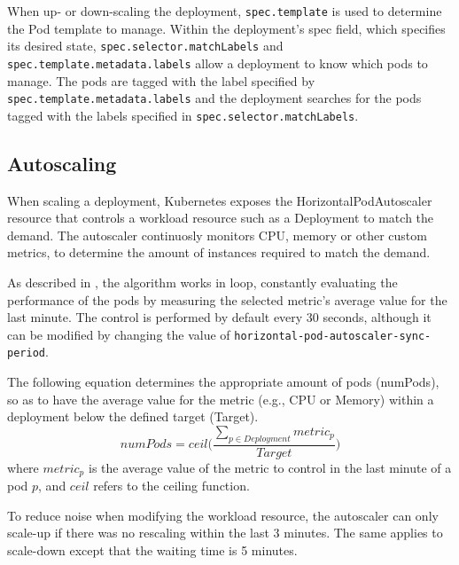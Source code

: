 \begin{sloppypar}
When up- or down-scaling the deployment, \lstinline{spec.template} is used to
determine the Pod template to manage. Within the deployment's spec field, which
specifies its desired state, \lstinline{spec.selector.matchLabels} and
\lstinline{spec.template.metadata.labels} allow a deployment to know
which pods to manage. The pods are tagged with the label specified by
\lstinline{spec.template.metadata.labels} and the deployment searches for the
pods tagged with the labels specified in
\lstinline{spec.selector.matchLabels}.
\end{sloppypar}

\subsection{Autoscaling}

When scaling a deployment, Kubernetes exposes the HorizontalPodAutoscaler
resource that controls a workload resource such as a Deployment to match the
demand. The autoscaler continuosly monitors CPU, memory or other custom metrics,
to determine the amount of instances required to match the demand.

\begin{sloppypar}
As described in \cite{KubernetesAutoscaling}, the algorithm works in loop,
constantly evaluating the performance of the pods by measuring the selected
metric's average value for the last minute. The control is performed by default
every 30 seconds, although it can be modified by changing the value of
\lstinline{horizontal-pod-autoscaler-sync-period}.
\end{sloppypar}

The following equation determines the appropriate amount of pods (numPods), so
as to have the average value for the metric (e.g., CPU or Memory) within a
deployment below the defined target (Target).
\begin{equation}
    numPods = ceil\bigg(\frac
        {\sum_{p \in Deployment} metric_p}
        {Target}
    \bigg)
\end{equation}
where $metric_p$ is the average value of the metric to control in the last
minute of a pod $p$, and $ceil$ refers to the ceiling function. 

To reduce noise when modifying the workload resource, the autoscaler can only
scale-up if there was no rescaling within the last 3 minutes. The same applies
to scale-down except that the waiting time is 5 minutes.


